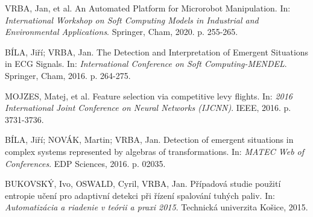 \documentclass[11pt,twoside,openright]{report}
\begin{document}
\begin{enumerate}[label={[V\arabic*]}]
	\item \label{roboti}VRBA, Jan, et al. An Automated Platform for Microrobot Manipulation. In: \textit{International Workshop on Soft Computing Models in Industrial and Environmental Applications}. Springer, Cham, 2020. p. 255-265.
	\item \label{bila1}BÍLA, Jiří; VRBA, Jan. The Detection and Interpretation of Emergent Situations in ECG Signals. In: \textit{International Conference on Soft Computing-MENDEL}. Springer, Cham, 2016. p. 264-275.

	\item \label{ijcnn3}MOJZES, Matej, et al. Feature selection via competitive levy flights. In: \textit{2016 International Joint Conference on Neural Networks (IJCNN)}. IEEE, 2016. p. 3731-3736.
	
	\item \label{bila2}BÍLA, Jiří; NOVÁK, Martin; VRBA, Jan. Detection of emergent situations in complex systems represented by algebras of transformations. In: \textit{MATEC Web of Conferences}. EDP Sciences, 2016. p. 02035.



	
	\item \label{artep2}BUKOVSKÝ, Ivo, OSWALD, Cyril, VRBA, Jan. Případová studie použití entropie učení pro adaptivní detekci při řízení spalování tuhých paliv. In: \textit{Automatizácia a riadenie v teórii a praxi 2015}. Technická univerzita Košice, 2015.
	

	
\end{enumerate}
\end{document}
